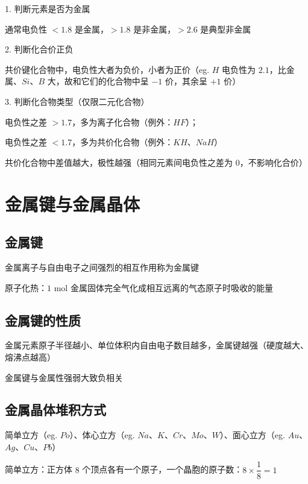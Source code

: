 \documentclass[UTF8,zihao=-4,openany]{ctexbook}
\begin{document}
1. 判断元素是否为金属\par

通常电负性 $<1.8$ 是金属，$>1.8$ 是非金属，$>2.6$ 是典型非金属\par

2. 判断化合价正负\par

共价键化合物中，电负性大者为负价，小者为正价（eg. $H$ 电负性为 $2.1$，比金属、$Si$、$B$ 大，故和它们的化合物中呈 $-1$ 价，其余呈 $+1$ 价）\par

3. 判断化合物类型（仅限二元化合物）\par

电负性之差 $>1.7$，多为离子化合物（例外：$HF$）；\par

电负性之差 $<1.7$，多为共价化合物（例外：$KH$、$NaH$）\par

共价化合物中差值越大，极性越强（相同元素间电负性之差为 $0$，不影响化合价）\par
\section{金属键与金属晶体}
\subsection{金属键}
金属离子与自由电子之间强烈的相互作用称为金属键\par

原子化热：$1$ mol 金属固体完全气化成相互远离的气态原子时吸收的能量\par
\subsection{金属键的性质}
金属元素原子半径越小、单位体积内自由电子数目越多，金属键越强（硬度越大、熔沸点越高）\par

金属键与金属性强弱大致负相关\par
\subsection{金属晶体堆积方式}
简单立方（eg. $Po$）、体心立方（eg. $Na$、$K$、$Cr$、$Mo$、$W$）、面心立方（eg. $Au$、$Ag$、$Cu$、$Pb$）\par

简单立方：正方体 $8$ 个顶点各有一个原子，一个晶胞的原子数：$8\times \dfrac{1}{8}=1$\par
\end{document}
